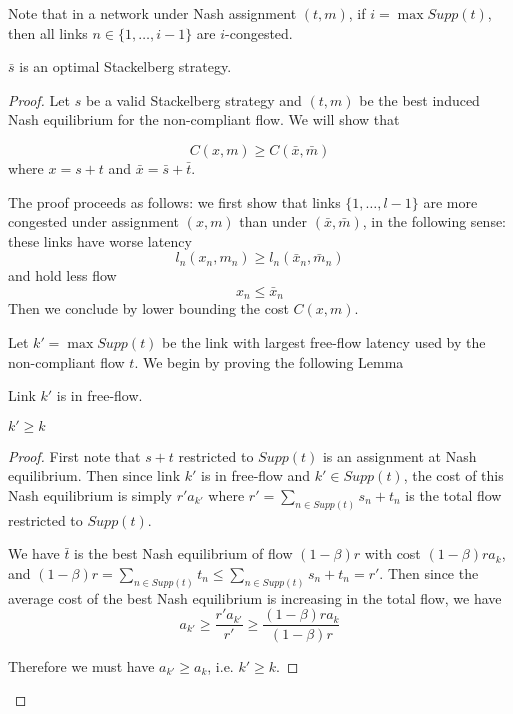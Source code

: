 Note that in a network under Nash assignment $(t, m)$, if $i = \max Supp(t)$, then all links $n \in \{1, \dots, i-1\}$ are $i$-congested.


\begin{theorem}
$\bar{s}$ is an optimal Stackelberg strategy.
\end{theorem}

\begin{proof}
Let $s$ be a valid Stackelberg strategy and $(t, m)$ be the best induced Nash equilibrium for the non-compliant flow. We will show that

\[
C(x, m) \geq C(\bar{x}, \bar{m})
\]
where $x = s+t$ and $\bar{x} = \bar{s} + \bar{t}$.

\noindent The proof proceeds as follows: we first show that links $\{1, \dots, l-1\}$ are more congested under assignment $(x, m)$ than under $(\bar{x}, \bar{m})$, in the following sense: these links have worse latency
\[
l_n(x_n, m_n) \geq l_n(\bar{x}_n, \bar{m}_n)
\]
and hold less flow
\[
x_n \leq \bar{x}_n
\]
Then we conclude by lower bounding the cost $C(x, m)$.

\bigskip

Let $k' = \max Supp(t)$ be the link with largest free-flow latency used by the non-compliant flow $t$. We begin by proving the following Lemma

\begin{lemma}
Link $k'$ is in free-flow.
\end{lemma}



\begin{lemma}
$k' \geq k$
\end{lemma}

\begin{proof}
First note that $s+t$ restricted to $Supp(t)$ is an assignment at Nash equilibrium. Then since link $k'$ is in free-flow and $k' \in Supp(t)$, the cost of this Nash equilibrium is simply $r'a_{k'}$ where $r' = \sum_{n\in Supp(t)} s_n + t_n$ is the total flow restricted to $Supp(t)$.

We have $\bar{t}$ is the best Nash equilibrium of flow $(1-\beta)r$ with cost $(1 - \beta)r a_k$, and $(1 - \beta)r = \sum_{n\in Supp(t)} t_n \leq \sum_{n\in Supp(t)} s_n + t_n = r'$. Then since the average cost of the best Nash equilibrium is increasing in the total flow, we have
\[
a_{k'} \geq\frac{r'a_{k'}}{r'} \geq \frac{(1-\beta)r a_k}{(1-\beta)r}
\]

Therefore we must have $a_{k'} \geq a_k$, i.e. $k' \geq k$.
\end{proof}



\end{proof}
